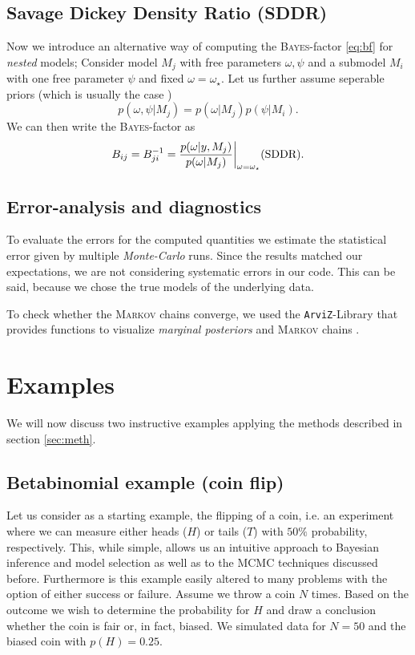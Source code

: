 \documentclass[%
 reprint,
 amsmath,amssymb,
 aps,
]{revtex4-1}
\begin{document}
\subsection{Savage Dickey Density Ratio (SDDR)} \label{subsec:sddr}
Now we introduce an alternative way of computing the \textsc{Bayes}-factor \eqref{eq:bf} for \emph{nested} models; Consider model $M_j$ with free parameters $\omega,\psi$ and a submodel $M_i$ with one free parameter $\psi$ and fixed $\omega=\omega_\star$. Let us further assume seperable priors (which is usually the case \cite{trotta}) $$p(\omega,\psi|M_j)=p(\omega|M_j)p(\psi|M_i).$$
We can then write the \textsc{Bayes}-factor as \cite{trotta} \begin{equation}
	\label{eq:sddr}
	B_{ij}=B_{ji}^{-1}=\frac{p(\omega|y,M_j)}{p(\omega|M_j)}\bigg|_{\omega=\omega_\star}  \text{\hfill (SDDR)}.
\end{equation}
\subsection{Error-analysis and diagnostics}
\noindent To evaluate the errors for the computed quantities we estimate the statistical error given by multiple \emph{Monte-Carlo} runs. Since the results matched our expectations, we are not considering systematic errors in our code. This can be said, because we chose the true models of the underlying data.

To check whether the \textsc{Markov} chains converge, we used the \texttt{ArviZ}-Library that provides functions to visualize \emph{marginal posteriors} and \textsc{Markov} chains \cite{ArviZ}. 
\section{Examples}\label{sec:examples}
\noindent We will now discuss two instructive examples applying the methods described in section \eqref{sec:meth}.

\subsection{Betabinomial example (coin flip)}\label{sec:coin}
\noindent Let us consider as a starting example, the flipping of a coin, i.e. an experiment where we can measure either heads ($H$) or tails ($T$) with $50\%$ probability, respectively. This, while simple, allows us an intuitive approach to Bayesian inference and model selection as well as to the MCMC techniques discussed before. Furthermore is this example easily altered to many problems with the option of either success or failure. Assume we throw a coin $N$ times.  Based on the outcome we wish to determine the probability for $H$ and draw a conclusion whether the coin is fair or, in fact, biased. We simulated data for $N=50$ and the biased coin with $p(H)=0.25$.
\end{document}
